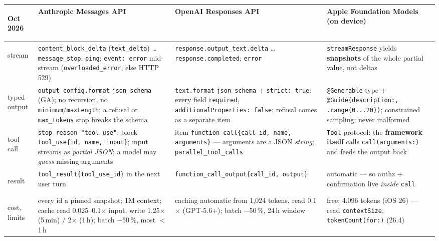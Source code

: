\documentclass[8pt]{extarticle}
\newcommand\ct[1]{\texttt{#1}}
\begin{document}
\vspace{1pt}
{\scriptsize\setlength\tabcolsep{2.5pt}
\noindent\begin{tabular}{@{}>{\bfseries\raggedright\arraybackslash}p{13mm}P{51mm}P{49mm}P{47mm}@{}}
\toprule
Oct 2026 & \textbf{Anthropic Messages API} & \textbf{OpenAI Responses API} & \textbf{Apple Foundation Models} (on device)\\
\midrule
stream & \ct{content\_block\_delta} (\ct{text\_delta}) … \ct{message\_stop}; \ct{ping}; \ct{event:\,error} mid-stream (\ct{overloaded\_error}, else HTTP 529) & \ct{response.output\_text.delta} … \ct{response.completed}; \ct{error} & \ct{streamResponse} yields \textbf{snapshots} of the whole partial value, not deltas\\
typed output & \ct{output\_config.format} \ct{json\_schema} (GA); no recursion, no \ct{minimum}/\ct{maxLength}; a refusal or \ct{max\_tokens} stop breaks the schema & \ct{text.format} \ct{json\_schema} + \ct{strict:\,true}: every field \ct{required}, \ct{additionalProperties:\,false}; refusal comes as a separate item & \ct{@Generable} type + \ct{@Guide(description:, .range(0...20))}; constrained sampling: never malformed\\
tool call & \ct{stop\_reason "tool\_use"}, block \ct{tool\_use\{id, name, input\}}; input streams as \emph{partial JSON}; a model may \emph{guess} missing arguments & item \ct{function\_call\{call\_id, name, arguments\}} — arguments are a JSON \emph{string}; \ct{parallel\_tool\_calls} & \ct{Tool} protocol; the \textbf{framework itself} calls \ct{call(arguments:)} and feeds the output back\\
result & \ct{tool\_result\{tool\_use\_id\}} in the next user turn & \ct{function\_call\_output\{call\_id, output\}} & automatic — so authz + confirmation live \emph{inside} \ct{call}\\
cost, limits & every id a pinned snapshot; 1M context; cache read 0.025–0.1$\times$ input, write 1.25$\times$ (5\,min) / 2$\times$ (1\,h); batch $-$50\,\%, most $<$1\,h & caching automatic from 1,024 tokens, read 0.1$\times$ (GPT-5.6+); batch $-$50\,\%, 24\,h window & free; 4,096 tokens (iOS 26) — read \ct{contextSize}, \ct{tokenCount(for:)} (26.4)\\
\bottomrule
\end{tabular}}
\end{document}
